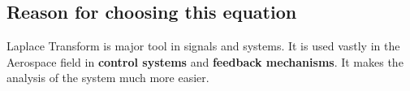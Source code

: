 \documentclass{article}
\begin{document}
\subsection*{Reason for choosing this equation}

Laplace Transform is major tool in signals and systems. It is used vastly in the Aerospace field in \textbf{control systems} and \textbf{feedback mechanisms}. It makes the analysis of the system much more easier. 



\end{document}
